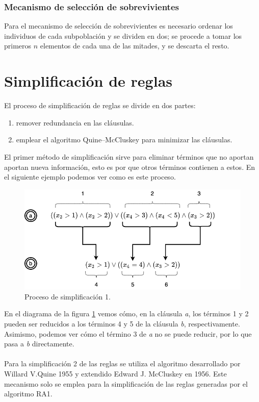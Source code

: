 \subsubsection{Mecanismo de selección de sobrevivientes}

Para el mecanismo de selección de sobrevivientes es necesario ordenar los individuos de cada subpoblación y se dividen en dos; se procede a tomar los primeros $n$ elementos de cada una de las mitades, y se descarta el resto.

\section{Simplificación de reglas}

El proceso de simplificación de reglas se divide en dos partes:
\begin{enumerate}
	\item remover redundancia en las cláusulas.
	\item emplear el algoritmo Quine–McCluskey para minimizar las cláusulas.
\end{enumerate}

El primer método de simplificación sirve para eliminar términos que no aportan aportan nueva información, esto es por que otros términos contienen a estos. En el siguiente ejemplo podemos ver como es este proceso.

\begin{figure}[H]
	\centering
	\includegraphics[width=\linewidth]{fig/clausulas}
	\caption{Proceso de simplificación 1.}
	\label{fig:simp1}
\end{figure}

En el diagrama de la figura \ref{fig:simp1} vemos cómo, en la cláusula \emph{a}, los términos 1 y 2 pueden ser reducidos a los términos 4 y 5 de la cláusula \emph{b}, respectivamente. Asimismo, podemos ver cómo el término 3 de \emph{a} no se puede reducir, por lo que pasa a \emph{b} directamente.
\\
\\
Para la simplificación 2 de las reglas se utiliza el algoritmo desarrollado por Willard V.Quine 1955 y extendido Edward J. McCluskey en 1956. Este mecanismo solo se emplea para la simplificación de las reglas generadas por el algoritmo RA1.

